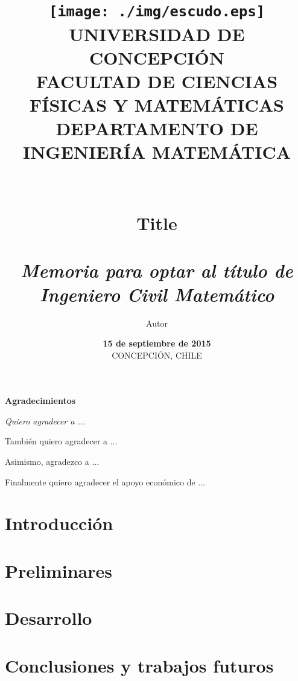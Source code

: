 \documentclass[10pt,letterpaper]{book} %
\title{\texttt{[image: ./img/escudo.eps]}\\
{\small\bf  UNIVERSIDAD DE CONCEPCI\'ON}\\
{\small\bf    FACULTAD DE CIENCIAS F\'ISICAS Y MATEM\'ATICAS}\\
{\small\bf    DEPARTAMENTO DE INGENIER\'IA MATEM\'ATICA}\\
     \hskip 1pt \\
     \hskip 1pt \\
    {\bf\huge Title}
\hskip 1pt \\
     \hskip 1pt \\
    {\it Memoria para optar al t\'itulo de Ingeniero Civil Matem\'atico}\\
}
\author{Autor}
\date{{\bf 15 de septiembre de 2015}\\
    CONCEPCI\'ON, CHILE}
\theoremstyle{plain}
\theoremstyle{definition}
\theoremstyle{remark}%
\begin{document}


\cleardoublepage

\vspace{4cm}
\setcounter{page}{3}
\begin{center}
\large{\textbf{Agradecimientos}} 
\end{center}


{\it 
Quiero agradecer a ...

También quiero agradecer a ...

Asimismo, agradezco a ...

Finalmente quiero agradecer el apoyo económico de ... 


}

\tableofcontents %

\cleardoublepage
{} %
\listoffigures %

\cleardoublepage
{} %
\listoftables %

\thispagestyle{empty}
\cleardoublepage
{} 
\chapter{Introducci\'on}
 
\chapter{Preliminares}
 
\chapter{Desarrollo}
 
\chapter{Conclusiones y trabajos futuros}
 
%  






 
\end{document}
